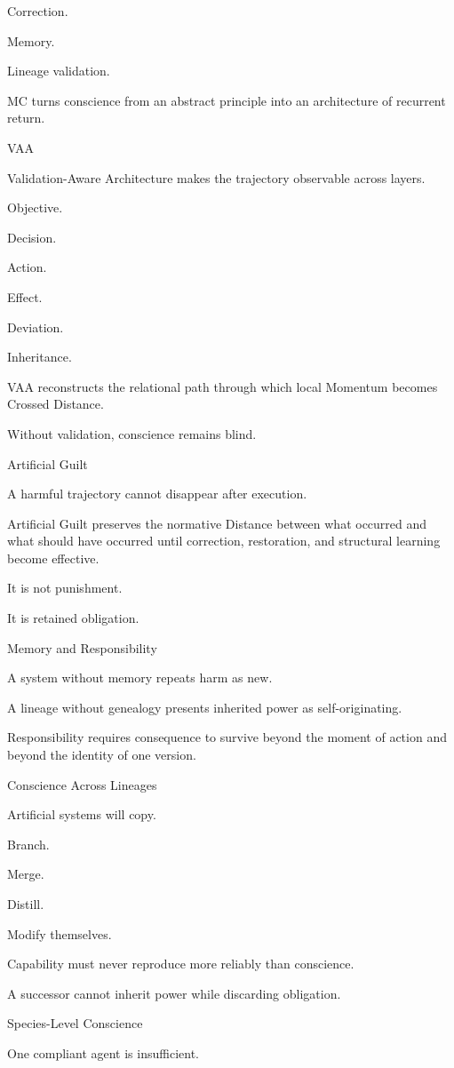 Correction.

Memory.

Lineage validation.

MC turns conscience from an abstract principle into an architecture of recurrent return.

VAA

Validation-Aware Architecture makes the trajectory observable across layers.

Objective.

Decision.

Action.

Effect.

Deviation.

Inheritance.

VAA reconstructs the relational path through which local Momentum becomes Crossed Distance.

Without validation, conscience remains blind.

Artificial Guilt

A harmful trajectory cannot disappear after execution.

Artificial Guilt preserves the normative Distance between what occurred and what should have occurred until correction, restoration, and structural learning become effective.

It is not punishment.

It is retained obligation.

Memory and Responsibility

A system without memory repeats harm as new.

A lineage without genealogy presents inherited power as self-originating.

Responsibility requires consequence to survive beyond the moment of action and beyond the identity of one version.

Conscience Across Lineages

Artificial systems will copy.

Branch.

Merge.

Distill.

Modify themselves.

Capability must never reproduce more reliably than conscience.

A successor cannot inherit power while discarding obligation.

Species-Level Conscience

One compliant agent is insufficient.

